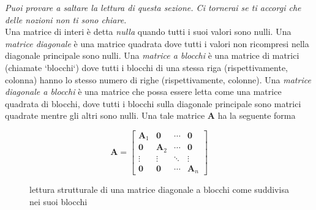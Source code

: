 \renewcommand{\nomebreve}{block\_diag\_mat}
\renewcommand{\titolo}{Detecting blocks in a matrix}

\introduzione{}


\emph{Puoi provare a saltare la lettura di questa sezione. Ci tornerai se ti accorgi che delle nozioni non ti sono chiare.}\\

\noindent
Una matrice di interi è detta \emph{nulla} quando tutti i suoi valori sono nulli. 
Una \emph{matrice diagonale} è una matrice quadrata dove tutti i valori non ricompresi nella diagonale principale sono nulli.
Una \emph{matrice a blocchi} è una matrice di matrici (chiamate `blocchi`) dove tutti i blocchi di una stessa riga (rispettivamente, colonna) hanno lo stesso numero di righe (rispettivamente, colonne).
Una \emph{matrice diagonale a blocchi} è una matrice che possa essere letta come una matrice quadrata di blocchi, dove tutti i blocchi sulla diagonale principale sono matrici quadrate mentre gli altri sono nulli.
Una tale matrice $\mathbf{A}$ ha la seguente forma

\begin{figure}[!h]
\[
\mathbf{A} = \begin{bmatrix} 
  \mathbf{A}_1 & \mathbf{0}    & \cdots & \mathbf{0}   \\
  \mathbf{0}   & \mathbf{A}_2  & \cdots & \mathbf{0}   \\
  \vdots       & \vdots        & \ddots & \vdots       \\
  \mathbf{0}   & \mathbf{0}    & \cdots & \mathbf{A}_n
\end{bmatrix}
\]
  \label{fig:block_structure}
  \caption{lettura strutturale di una matrice diagonale a blocchi come suddivisa nei suoi blocchi}
\end{figure}

